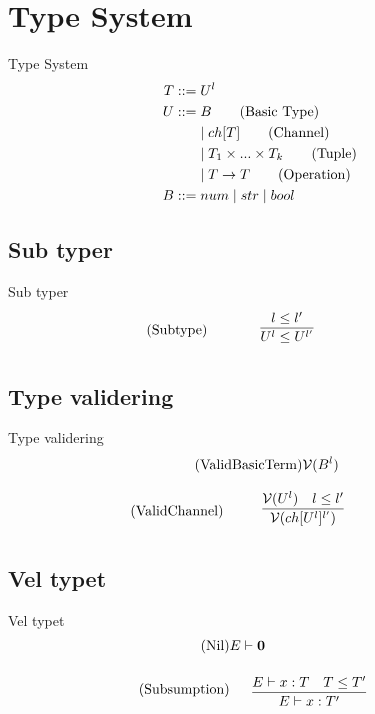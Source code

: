 \section{Type System}
\begin{frame}{Type System}
    \begin{align*}
        T::=&\;U^l\\    	
        U::=&\;B \tag{Basic Type}\\
        &\mid ch[T] \tag{Channel}\\
        &\mid T_1 \times...\times T_k \tag{Tuple}\\
        &\mid T\rightarrow T \tag{Operation}\\
        B::=&\;num 
        \mid str
        \mid bool\\
    \end{align*}
\end{frame}

\subsection{Sub typer}
\begin{frame}{Sub typer}
    \begin{align*}
       \tag{Subtype}\label{rule:Subtype} &\infrule{l\leq l'}{U^l\leq U^{l'}}
    \end{align*}
\end{frame}

\subsection{Type validering}
\begin{frame}{Type validering}
    \begin{align*}
        \tag{ValidBasicTerm}\label{rule:ValidBasicTerm} &\mathcal{V}(B^l)
    \end{align*}

    \begin{align*}
        \tag{ValidChannel}\label{rule:ValidChannel} &\infrule{\valid{U^l}\quad l\leq l'}{\valid{ch[U^l]^{l'}}}
    \end{align*}
\end{frame}

\subsection{Vel typet}
\begin{frame}{Vel typet}
    \begin{align*}
        \tag{Nil}\label{rule:Nil} &E \vdash \nil\\
        \tag{Subsumption}\label{rule:subsumption} &\infrule{E\vdash x:T\quad T\leq T'}{E\vdash x:T'}
    \end{align*}
\end{frame}




